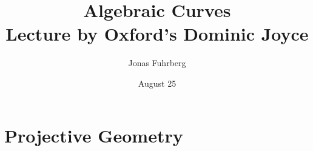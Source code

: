 \documentclass[12pt]{article}
\title{Algebraic Curves \\ \large Lecture by Oxford's Dominic Joyce}
\author{Jonas Fuhrberg}
\date{August 25}
\begin{document}
\maketitle
\newpage

\section*{Projective Geometry}

    
\end{document}
